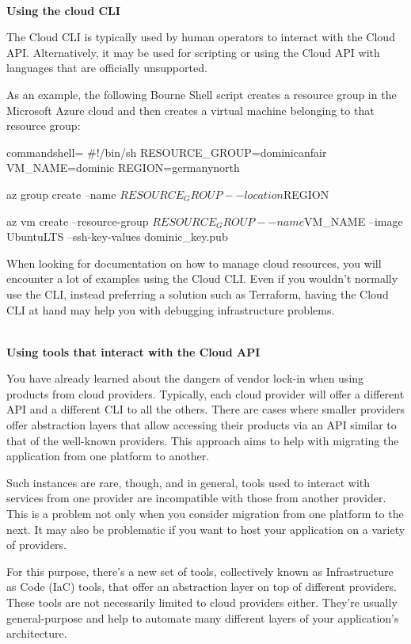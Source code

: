 \hspace*{\fill} \\ %
\noindent
\textbf{Using the cloud CLI}

The Cloud CLI is typically used by human operators to interact with the Cloud API. Alternatively, it may be used for scripting or using the Cloud API with languages that are officially unsupported.

As an example, the following Bourne Shell script creates a resource group in the Microsoft Azure cloud and then creates a virtual machine belonging to that resource group:

\begin{tcblisting}{commandshell={}}
#!/bin/sh
RESOURCE_GROUP=dominicanfair
VM_NAME=dominic
REGION=germanynorth

az group create --name $RESOURCE_GROUP --location $REGION

az vm create --resource-group $RESOURCE_GROUP --name $VM_NAME --image
UbuntuLTS --ssh-key-values dominic_key.pub
\end{tcblisting}

When looking for documentation on how to manage cloud resources, you will encounter a lot of examples using the Cloud CLI. Even if you wouldn't normally use the CLI, instead preferring a solution such as Terraform, having the Cloud CLI at hand may help you with debugging infrastructure problems.

\hspace*{\fill} \\ %
\noindent
\textbf{Using tools that interact with the Cloud API}

You have already learned about the dangers of vendor lock-in when using products from cloud providers. Typically, each cloud provider will offer a different API and a different CLI to all the others. There are cases where smaller providers offer abstraction layers that allow accessing their products via an API similar to that of the well-known providers. This approach aims to help with migrating the application from one platform to another.

Such instances are rare, though, and in general, tools used to interact with services from one provider are incompatible with those from another provider. This is a problem not only when you consider migration from one platform to the next. It may also be problematic if you want to host your application on a variety of providers.

For this purpose, there's a new set of tools, collectively known as Infrastructure as Code (IaC) tools, that offer an abstraction layer on top of different providers. These tools are not necessarily limited to cloud providers either. They're usually general-purpose and help to automate many different layers of your application's architecture.

